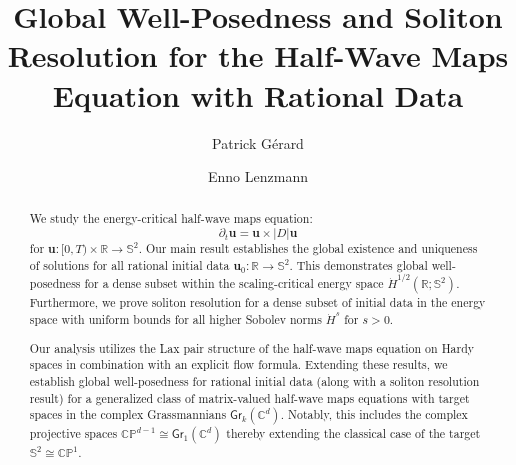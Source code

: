 \documentclass[11pt,reqno]{amsart}
\theoremstyle{definition}
\theoremstyle{remark}
\theoremstyle{remark}
\numberwithin{equation}{section}
\newcommand{\Ss}{\mathbb{S}}
\newcommand{\uu}{\mathbf{u}}
\newcommand{\Gr}{\mathsf{Gr}}
\begin{document}
\title[GWP and Soliton Resolution for HWM with Rational Data]{Global Well-Posedness and Soliton Resolution for the Half-Wave Maps Equation with Rational Data}

\author{Patrick G\'erard}
\address{P. G\'erard,  Laboratoire de Math\'ematiques d'Orsay, CNRS, Universit\'e Paris-Saclay, 91405 Orsay, France.}%

\author{Enno Lenzmann}
\address{E. Lenzmann, University of Basel, Department of Mathematics and Computer Science, Spiegelgasse 1, CH-4051 Basel, Switzerland.}%

\maketitle

\begin{abstract}
We study the energy-critical half-wave maps equation:
\[
\partial_t \uu = \uu \times |D| \uu 
\]
for $\uu : [0, T) \times \mathbb{R} \to \Ss^2$. Our main result establishes the global existence and uniqueness of solutions for all rational initial data $\uu_0 : \mathbb{R} \to \Ss^2$. This demonstrates global well-posedness for a dense subset within the scaling-critical energy space \( \dot{H}^{1/2}(\mathbb{R}; \mathbb{S}^2) \). Furthermore, we prove soliton resolution for a dense subset of initial data in the energy space with uniform bounds for all higher Sobolev norms $\dot{H}^s$ for $s > 0$. 

Our analysis utilizes the Lax pair structure of the half-wave maps equation on Hardy spaces in combination with an explicit flow formula. Extending these results, we establish global well-posedness for rational initial data (along with a soliton resolution result) for a generalized class of matrix-valued half-wave maps equations with target spaces in the complex Grassmannians \( \Gr_k(\mathbb{C}^d) \). Notably, this includes the complex projective spaces \( \mathbb{CP}^{d-1} \cong \Gr_1(\mathbb{C}^d) \) thereby extending the classical case of the target \( \Ss^2 \cong \mathbb{CP}^1 \).
\end{abstract}
\end{document}
